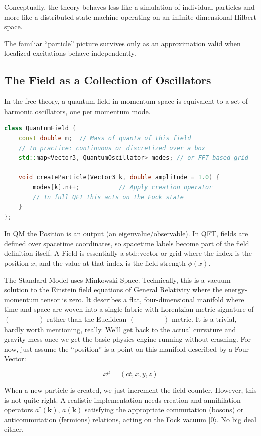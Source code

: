 Conceptually, the theory behaves less like a simulation of individual particles and more like a distributed state machine operating on an infinite-dimensional Hilbert space.

The familiar ``particle'' picture survives only as an approximation valid when localized excitations behave independently.


\subsection*{The Field as a Collection of Oscillators}

In the free theory, a quantum field in momentum space is equivalent to a set of harmonic oscillators, one per momentum mode.

\begin{lstlisting}[language=C++, caption=Free Quantum Field (Momentum Space)]
class QuantumField {
    const double m;  // Mass of quanta of this field
    // In practice: continuous or discretized over a box
    std::map<Vector3, QuantumOscillator> modes; // or FFT-based grid

    void createParticle(Vector3 k, double amplitude = 1.0) {
        modes[k].n++;           // Apply creation operator
        // In full QFT this acts on the Fock state
    }
};
\end{lstlisting}

In QM the Position is an output (an eigenvalue/observable). In QFT, fields are defined over spacetime coordinates, so spacetime labels become part of the field definition itself.
A Field is essentially a std::vector or grid where the index is the position $x$, and the value at that index is the field strength $\phi(x)$.

The Standard Model uses Minkowski Space.
Technically, this is a vacuum solution to the Einstein field equations of General Relativity where the energy-momentum tensor is zero.
It describes a flat, four-dimensional manifold where time and space are woven into a single fabric with Lorentzian metric signature of $(-+++)$ rather than the Euclidean $(++++)$ metric.
It is a trivial, hardly worth mentioning, really.
We'll get back to the actual curvature and gravity mess once we get the basic physics engine running without crashing.
For now, just assume the ``position'' is a point on this manifold described by a Four-Vector:

\[
x^\mu = (ct, x, y, z)
\]

When a new particle is created, we just increment the field counter. However, this is not quite right.
A realistic implementation needs creation and annihilation operators $a^\dagger(\mathbf{k})$, $a(\mathbf{k})$ satisfying the appropriate commutation (bosons) or anticommutation (fermions) relations, acting on the Fock vacuum $|0\rangle$. No big deal either.



